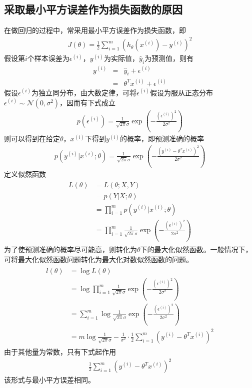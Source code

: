 \subsection{采取最小平方误差作为损失函数的原因}
在做回归的过程中，常采用最小平方误差作为损失函数，即
\begin{eqnarray}
J(\theta)=\frac{1}{2}\sum_{i=1}^m(h_\theta(x^{(i)})-y^{(i)})^2
\end{eqnarray}
假设第$i$个样本误差为$\epsilon^{(i)}$，$y^{(i)}$为实际值，$\hat{y}_i$为预测值，则有
\begin{eqnarray}
y^{(i)}&=&\hat{y}_i+\epsilon^{(i)}\\
&=&\theta^Tx^{(i)}+\epsilon^{(i)}
\end{eqnarray}
假设$\epsilon^{(i)}$为独立同分布，由大数定律，可将$\epsilon^{(i)}$假设为服从正态分布$\epsilon^{(i)}\sim \mathcal{N}(0,\sigma^2)$，因而有下式成立
\begin{eqnarray}
p(\epsilon^{(i)})=\frac{1}{\sqrt{2\pi}\sigma}\exp
\left(
-\frac{(\epsilon^{(i)})^2}{2\sigma^2}
\right)
\end{eqnarray}
则可以得到在给定$\theta$，$x^{(i)}$下得到$y^{(i)}$的概率，即预测准确的概率
\begin{eqnarray}
p(y^{(i)}|x^{(i)};\theta)=\frac{1}{\sqrt{2\pi}\sigma}\exp
\left(
-\frac{(y^{(i)}-\theta^Tx^{(i)})^2}{2\sigma^2}
\right)
\end{eqnarray}
定义似然函数
\begin{eqnarray}
\begin{aligned}
L(\theta)&=L(\theta;X,Y)\\
&=p(Y|X;\theta)\\
&=\prod_{i=1}^m p(y^{(i)}|x^{(i)};\theta)\\
&=\prod_{i=1}^m \frac{1}{\sqrt{2\pi}\sigma}\exp
\left(
-\frac{(\epsilon^{(i)})^2}{2\sigma^2}
\right)
\end{aligned}
\end{eqnarray}
为了使预测准确的概率尽可能高，则转化为$\theta$下的最大化似然函数。一般情况下，可将最大化似然函数问题转化为最大化对数似然函数的问题。
\begin{eqnarray}
\begin{aligned}
l(\theta) &= \log L(\theta)\\
&=\log \prod_{i=1}^m \frac{1}{\sqrt{2\pi}\sigma}\exp
\left(
-\frac{(\epsilon^{(i)})^2}{2\sigma^2}
\right)\\
&= \sum_{i=1}^m\log \frac{1}{\sqrt{2\pi}\sigma}\exp
\left(
-\frac{(\epsilon^{(i)})^2}{2\sigma^2}
\right)\\
&= m\log\frac{1}{\sqrt{2\pi}\sigma}-\frac{1}{\sigma^2}\cdot\frac{1}{2}\sum_{i=1}^m(y^{(i)}-\theta^Tx^{(i)})^2
\end{aligned}
\end{eqnarray}
由于其他量为常数，只有下式起作用
\begin{eqnarray}
\frac{1}{2}\sum_{i=1}^m(y^{(i)}-\theta^Tx^{(i)})^2
\end{eqnarray}
该形式与最小平方误差相同。

